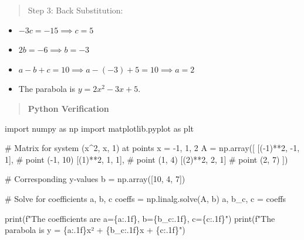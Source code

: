 \documentclass[
  letterpaper,
  DIV=11,
  numbers=noendperiod]{scrreprt}
\newenvironment{Shaded}{\begin{snugshade}}{\end{snugshade}}
\newcommand{\BuiltInTok}[1]{\textcolor[rgb]{0.00,0.23,0.31}{#1}}
\newcommand{\CommentTok}[1]{\textcolor[rgb]{0.37,0.37,0.37}{#1}}
\newcommand{\DecValTok}[1]{\textcolor[rgb]{0.68,0.00,0.00}{#1}}
\newcommand{\ImportTok}[1]{\textcolor[rgb]{0.00,0.46,0.62}{#1}}
\newcommand{\NormalTok}[1]{\textcolor[rgb]{0.00,0.23,0.31}{#1}}
\newcommand{\OperatorTok}[1]{\textcolor[rgb]{0.37,0.37,0.37}{#1}}
\newcommand{\SpecialCharTok}[1]{\textcolor[rgb]{0.37,0.37,0.37}{#1}}
\newcommand{\SpecialStringTok}[1]{\textcolor[rgb]{0.13,0.47,0.30}{#1}}
\begin{document}
\begin{quote}
Step 3: Back Substitution:
\end{quote}

\begin{itemize}
\item
  \(-3c = -15 \implies c = 5\)
\item
  \(2b = -6 \implies b = -3\)
\item
  \(a - b + c = 10 \implies a - (-3) + 5 = 10 \implies a = 2\)
\item
  The parabola is \(y = 2x^2 - 3x + 5\).
\end{itemize}

\begin{quote}
\textbf{Python Verification}
\end{quote}

\begin{Shaded}
\begin{Highlighting}[]
\ImportTok{import}\NormalTok{ numpy }\ImportTok{as}\NormalTok{ np}
\ImportTok{import}\NormalTok{ matplotlib.pyplot }\ImportTok{as}\NormalTok{ plt}

\CommentTok{\# Matrix for system (x\^{}2, x, 1) at points x = {-}1, 1, 2}
\NormalTok{A }\OperatorTok{=}\NormalTok{ np.array([}
\NormalTok{    [(}\OperatorTok{{-}}\DecValTok{1}\NormalTok{)}\OperatorTok{**}\DecValTok{2}\NormalTok{, }\OperatorTok{{-}}\DecValTok{1}\NormalTok{, }\DecValTok{1}\NormalTok{],   }\CommentTok{\# point ({-}1, 10)}
\NormalTok{    [(}\DecValTok{1}\NormalTok{)}\OperatorTok{**}\DecValTok{2}\NormalTok{,  }\DecValTok{1}\NormalTok{, }\DecValTok{1}\NormalTok{],    }\CommentTok{\# point (1, 4)}
\NormalTok{    [(}\DecValTok{2}\NormalTok{)}\OperatorTok{**}\DecValTok{2}\NormalTok{,  }\DecValTok{2}\NormalTok{, }\DecValTok{1}\NormalTok{]     }\CommentTok{\# point (2, 7)}
\NormalTok{])}

\CommentTok{\# Corresponding y{-}values}
\NormalTok{b }\OperatorTok{=}\NormalTok{ np.array([}\DecValTok{10}\NormalTok{, }\DecValTok{4}\NormalTok{, }\DecValTok{7}\NormalTok{])}

\CommentTok{\# Solve for coefficients a, b, c}
\NormalTok{coeffs }\OperatorTok{=}\NormalTok{ np.linalg.solve(A, b)}
\NormalTok{a, b\_c, c }\OperatorTok{=}\NormalTok{ coeffs}

\BuiltInTok{print}\NormalTok{(}\SpecialStringTok{f"The coefficients are a=}\SpecialCharTok{\{}\NormalTok{a}\SpecialCharTok{:.1f\}}\SpecialStringTok{, b=}\SpecialCharTok{\{}\NormalTok{b\_c}\SpecialCharTok{:.1f\}}\SpecialStringTok{, c=}\SpecialCharTok{\{}\NormalTok{c}\SpecialCharTok{:.1f\}}\SpecialStringTok{"}\NormalTok{)}
\BuiltInTok{print}\NormalTok{(}\SpecialStringTok{f"The parabola is y = }\SpecialCharTok{\{}\NormalTok{a}\SpecialCharTok{:.1f\}}\SpecialStringTok{x² + }\SpecialCharTok{\{}\NormalTok{b\_c}\SpecialCharTok{:.1f\}}\SpecialStringTok{x + }\SpecialCharTok{\{}\NormalTok{c}\SpecialCharTok{:.1f\}}\SpecialStringTok{"}\NormalTok{)}


\end{Highlighting}
\end{Shaded}
\end{document}
